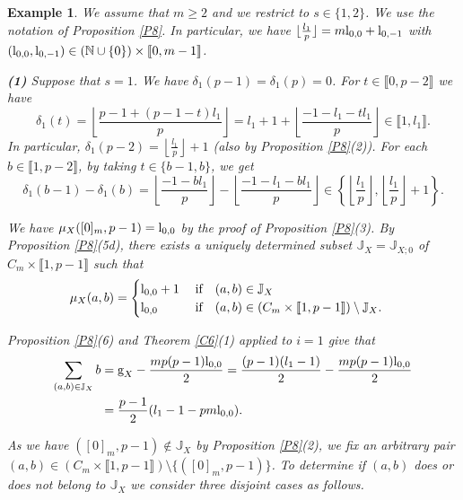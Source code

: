 \documentclass[11pt]{amsart}
\newtheorem{ex}[theorem]{Example}
\def\l{\textup{l}}
\begin{document}
\begin{ex}\normalfont\label{EX12}
We assume that $m\ge 2$ and we restrict to $s\in\{1,2\}$. We use the notation of Proposition \ref{P8}. In particular, we have $\lfloor\frac{l_1}{p}\rfloor=m\l_{0,0}+\l_{0,-1}$ with $(\l_{0,0},\l_{0,-1})\in (\mathbb N\cup\{0\})\times\llbracket0,m-1\rrbracket$.

\medskip
{\bf (1)} Suppose that $s=1$. We have $\delta_1(p-1)=\delta_1(p)=0$. For $t\in\llbracket0,p-2\rrbracket$ we have
\[
\delta_1(t)=
\left\lfloor\frac{p-1+(p-1-t)l_1}{p}\right\rfloor=l_1+1+\left\lfloor\frac{-1-l_1-tl_1}{p}\right\rfloor\in\llbracket1,l_1\rrbracket.
\]
In particular, $\delta_1(p-2)=\left\lfloor\frac{l_1}{p}\right\rfloor+1$ (also by Proposition \ref{P8}(2)). 
For each $b\in\llbracket1,p-2\rrbracket$, by taking $t\in\{b-1,b\}$, we get
$$\delta_1(b-1)-\delta_1(b)=\left\lfloor\frac{-1-bl_1}{p}\right\rfloor-\left\lfloor\frac{-1-l_1-bl_1}{p}\right\rfloor\in\left\{\left\lfloor\frac{l_1}{p}\right\rfloor,\left\lfloor\frac{l_1}{p}\right\rfloor+1\right\}.$$

We have $\mu_X([0]_m,p-1)=\l_{0,0}$ by the proof of Proposition \ref{P8}(3). By Proposition \ref{P8}(5d), there exists a uniquely determined subset $\mathbb J_X=\mathbb J_{X;0}$ of $C_m\times\llbracket1,p-1\rrbracket$ such that
$$\mu_X(a,b)=\begin{cases}\l_{0,0}+1\quad\;\textup{if}\quad (a,b)\in\mathbb J_X\\
\l_{0,0}\quad\quad\quad\textup{if}\quad (a,b)\in(C_m\times\llbracket1,p-1\rrbracket)\setminus\mathbb J_X.\end{cases}$$

Proposition \ref{P8}(6) and Theorem \ref{C6}(1) applied to $i=1$ give that
\begin{equation}\label{EQ62}
\begin{aligned}
\sum_{(a,b)\in\mathbb J_X} b&=\textup{g}_X-\frac{mp(p-1)\l_{0,0}}{2}=\frac{(p-1)(l_1-1)}{2}-\frac{mp(p-1)\l_{0,0}}{2}\\
&=\frac{p-1}{2}(l_1-1-pm\l_{0,0}).
\end{aligned}
\end{equation}

As we have $([0]_m,p-1)\notin\mathbb J_X$ by Proposition \ref{P8}(2), we fix an arbitrary pair $(a,b)\in (C_m\times\llbracket1,p-1\rrbracket)\setminus\{([0]_m,p-1)\}$. To determine if $(a,b)$ does or does not belong to $\mathbb J_X$ we consider three disjoint cases as follows. 


\end{ex}
\end{document}
